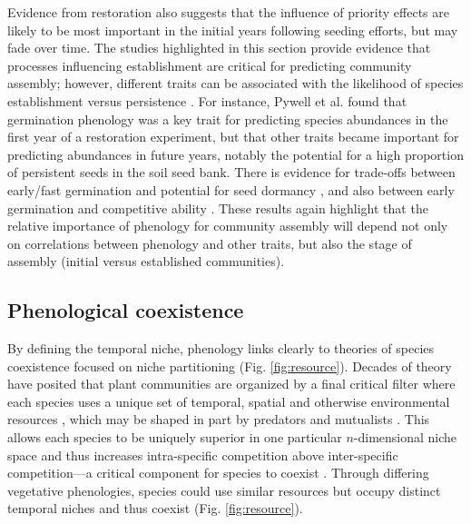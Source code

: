 \documentclass[11pt]{article}
\newcommand{\R}[1]{\label{}\linelabel{#1}}
\begin{document}
\R{stage1} Evidence from restoration also suggests that the influence of priority effects are likely to be most important in the initial years following seeding efforts, but may fade over time. The studies highlighted in this section provide evidence that processes influencing establishment are critical for predicting community assembly; however, different traits can be associated with the likelihood of species establishment versus persistence \citep{larson2016regeneration}. For instance, Pywell et al. \citeyear{pywell2003plant} found that germination phenology was a key trait for predicting species abundances in the first year of a restoration experiment, but that other traits became important for predicting abundances in future years, notably the potential for a high proportion of persistent seeds in the soil seed bank. There is evidence for trade-offs between early/fast germination and potential for seed dormancy \citep{waterton2021trade}, and also between early germination and competitive ability \citep{kraft2015community}. These results again highlight that the relative importance of phenology for community assembly will depend not only on correlations between phenology and other traits, but also the stage of assembly (initial versus established communities).\R{stage2} 

\subsection*{Phenological coexistence}

By defining the temporal niche, phenology links clearly to theories of species coexistence focused on niche partitioning \R{reffig1}(Fig. \ref{fig:resource}). Decades of theory have posited that plant communities are organized by a final critical filter where each species uses a unique set of temporal, spatial and otherwise environmental resources \citep{Hutchinson:1959xi}, which may be shaped in part by predators and mutualists \citep{mcpeek2022coexistence}. This allows each species to be uniquely superior in one particular $n$-dimensional niche space and thus increases intra-specific competition above inter-specific competition---a critical component for species to coexist \citep{Chesson:2000vd,hillerislambers2012rethinking,mcpeek2022coexistence}. Through differing vegetative phenologies, species could use similar resources but occupy distinct temporal niches and thus coexist (Fig. \ref{fig:resource}). 
\end{document}
